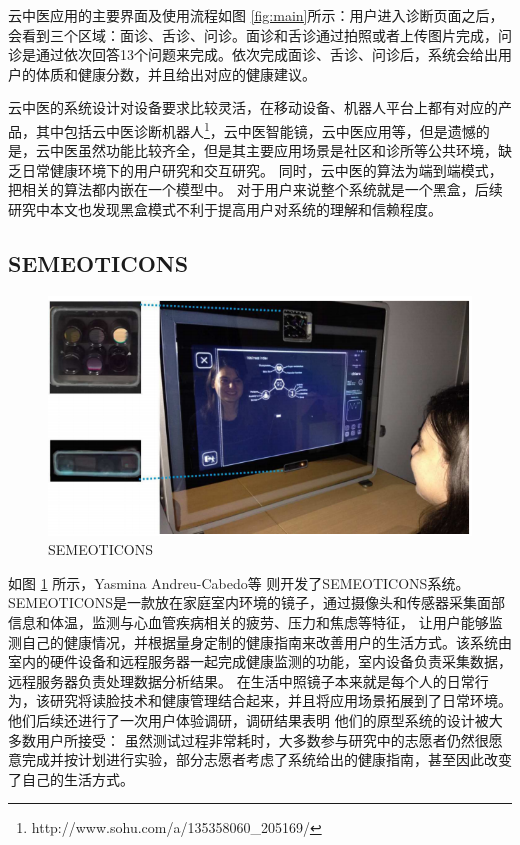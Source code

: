 云中医应用的主要界面及使用流程如图 \ref{fig:main}所示：用户进入诊断页面之后，会看到三个区域：面诊、舌诊、问诊。面诊和舌诊通过拍照或者上传图片完成，问诊是通过依次回答13个问题来完成。依次完成面诊、舌诊、问诊后，系统会给出用户的体质和健康分数，并且给出对应的健康建议。

云中医的系统设计对设备要求比较灵活，在移动设备、机器人平台上都有对应的产品，其中包括云中医诊断机器人\footnote{http://www.sohu.com/a/135358060\_205169/}，云中医智能镜\cite{李雪2016}，云中医应用\cite{钱鹏基于云中医的健康监测方法及系统}等，但是遗憾的是，云中医虽然功能比较齐全，但是其主要应用场景是社区和诊所等公共环境，缺乏日常健康环境下的用户研究和交互研究。
同时，云中医的算法为端到端模式，把相关的算法都内嵌在一个模型中。
对于用户来说整个系统就是一个黑盒，后续研究中本文也发现黑盒模式不利于提高用户对系统的理解和信赖程度。

\subsection{SEMEOTICONS}

\begin{figure}[h]
    \centering
    \includegraphics[width=12cm]{images/mirror.png}
    \caption{SEMEOTICONS}
    \label{fig:seme}
\end{figure}
如图 \ref{fig:seme} 所示，Yasmina Andreu-Cabedo等 \cite{andreu2015mirror}则开发了SEMEOTICONS系统。
SEMEOTICONS是一款放在家庭室内环境的镜子，通过摄像头和传感器采集面部信息和体温，监测与心血管疾病相关的疲劳、压力和焦虑等特征， 让用户能够监测自己的健康情况，并根据量身定制的健康指南来改善用户的生活方式。该系统由室内的硬件设备和远程服务器一起完成健康监测的功能，室内设备负责采集数据，远程服务器负责处理数据分析结果。
在生活中照镜子本来就是每个人的日常行为，该研究将读脸技术和健康管理结合起来，并且将应用场景拓展到了日常环境。
他们后续还进行了一次用户体验调研，调研结果表明\cite{coppini2017user} 他们的原型系统的设计被大多数用户所接受： 虽然测试过程非常耗时，大多数参与研究中的志愿者仍然很愿意完成并按计划进行实验，部分志愿者考虑了系统给出的健康指南，甚至因此改变了自己的生活方式。

